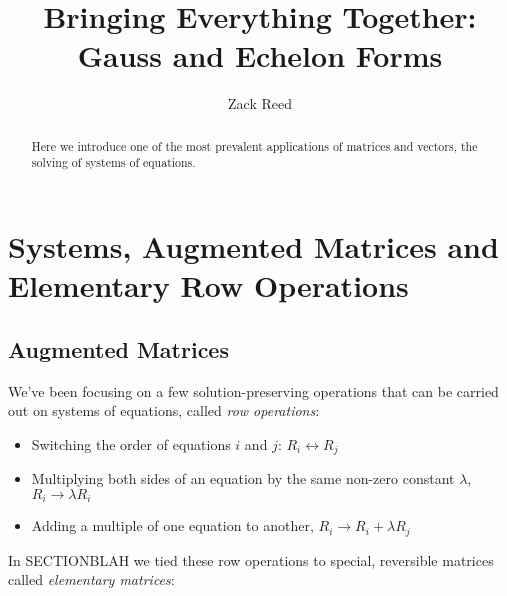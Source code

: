 \documentclass{ximera}
\author{Zack Reed} %
\title{Bringing Everything Together: Gauss and Echelon Forms}
\begin{document}
\begin{abstract}
Here we introduce one of the most prevalent applications of matrices and vectors, the solving of systems of equations.
\end{abstract}
\maketitle
    
\section*{Systems, Augmented Matrices and Elementary Row Operations}
 
\subsection*{Augmented Matrices}
 
We've been focusing on a few solution-preserving operations that can be carried out on systems of equations, called \emph{row operations}:
\begin{itemize}
\item Switching the order of equations $i$ and $j$: $R_i\leftrightarrow R_j$
\item Multiplying both sides of an equation by the same non-zero constant $\lambda$, $R_i\rightarrow\lambda R_i$
\item Adding a multiple of one equation to another, $R_i\rightarrow R_i+\lambda R_j$
\end{itemize}
 
 
In SECTIONBLAH we tied these row operations to special, reversible matrices called \emph{elementary matrices}:
\end{document}
